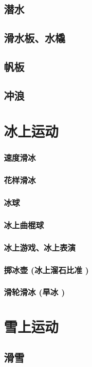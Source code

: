 \documentclass[UTF8]{../../ApplicationUniverse}
\begin{document}
    \subsection{潜水}
    \subsection{滑水板、水橇}
    \subsection{帆板}
    \subsection{冲浪}

\section{冰上运动}
    \subsubsection{速度滑冰}
    \subsubsection{花样滑冰}
    \subsubsection{冰球}
    \subsubsection{冰上曲棍球}
    \subsubsection{冰上游戏、冰上表演}
    \subsubsection{掷冰壶 (冰上溜石比准 )}
    \subsubsection{滑轮滑冰 (旱冰 )}
 
\section{雪上运动}
    \subsection{滑雪}
\end{document}
